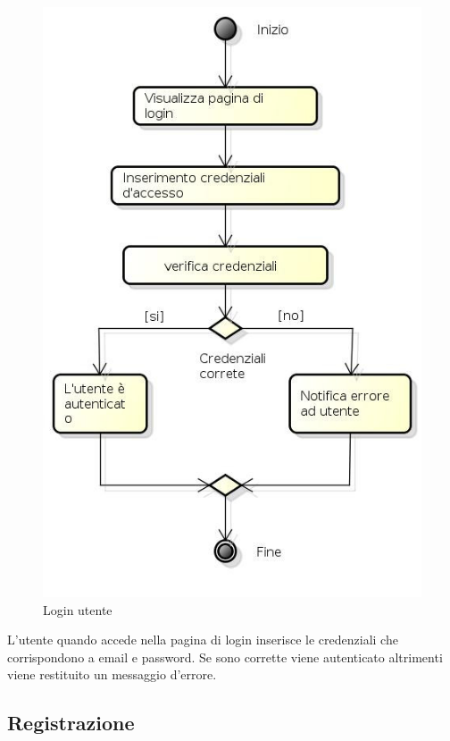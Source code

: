 \begin{figure}[h!]
		\centering
		\includegraphics[scale=.5]{img/Login.jpg}
		\caption{Login utente}
		\label{fig:Login}
\end{figure}

L'utente quando accede nella pagina di login inserisce le credenziali che corrispondono a email e password. Se sono corrette viene autenticato altrimenti viene restituito un messaggio d'errore.

\newpage

\subsection{Registrazione}

